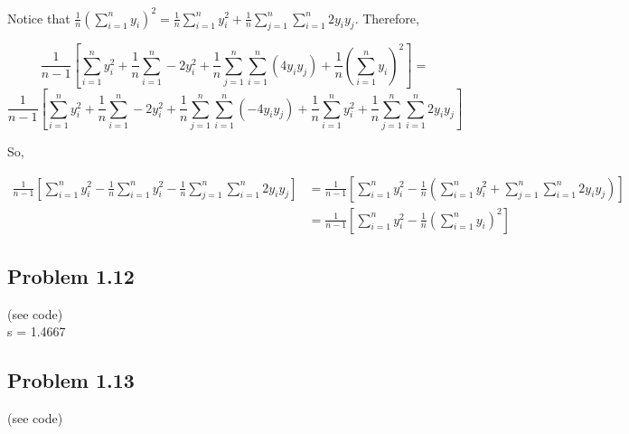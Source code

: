 \documentclass[12pt]{article}
\begin{document}
    Notice that $\frac{1}{n}\left( \sum_{i = 1}^n y_i \right)^2 = \frac{1}{n} \sum_{i = 1}^n y_i^2 + \frac{1}{n} \sum_{j = 1}^n \sum_{i = 1}^n 2 y_i y_j$. Therefore,
    
    \[ \frac{1}{n-1} \left[ \sum_{i = 1}^n y_i^2 + \frac{1}{n} \sum_{i = 1}^n -2y_i^2 + \frac{1}{n} \sum_{j = 1}^n \sum_{i = 1}^n (4 y_i y_j) + \frac{1}{n} \left( \sum_{i = 1}^n y_i \right)^2 \right] =  \]
    \[ \frac{1}{n-1} \left[ \sum_{i = 1}^n y_i^2 + \frac{1}{n} \sum_{i = 1}^n -2y_i^2 + \frac{1}{n} \sum_{j = 1}^n \sum_{i = 1}^n (-4y_iy_j) + \frac{1}{n} \sum_{i = 1}^n y_i^2 + \frac{1}{n} \sum_{j = 1}^n \sum_{i = 1}^n 2y_iy_j \right] \]
    
    So,
    
    \begin{align*}
        \frac{1}{n-1} \left[ \sum_{i = 1}^n y_i^2 - \frac{1}{n} \sum_{i = 1}^n y_i^2 - \frac{1}{n} \sum_{j = 1}^n \sum_{i = 1}^n 2y_iy_j \right] &= \frac{1}{n - 1} \left[ \sum_{i = 1}^n y_i^2 - \frac{1}{n} \left( \sum_{i = 1}^n y_i^2 + \sum_{j = 1}^n \sum_{i = 1}^n 2 y_i y_j \right) \right] \\
        &= \frac{1}{n-1} \left[ \sum_{i = 1}^n y_i^2 - \frac{1}{n} \left( \sum_{i = 1}^n y_i \right)^2 \right]
    \end{align*}
    

\subsection*{Problem 1.12}
    (see code) \\
    
    s = 1.4667
\subsection*{Problem 1.13}
    (see code) \\
    
\end{document}

